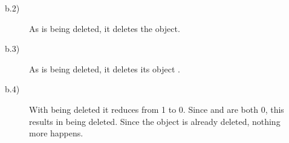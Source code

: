 \documentclass[pdf,ps2pdf,11pt]{SANDreport}
\begin{document}
\begin{description}
\begin{description}
  {}\item[b.2)] As {} is being deleted, it deletes the
  {} object.

  {}\item[b.3)] As {} is being deleted, it deletes its
  {} object {}.

  {}\item[b.4)] With {} being deleted it reduces
  {} from 1 to 0.  Since
  {} and {} are
  both 0, this results in {} being deleted.  Since the
  object {} is already deleted, nothing more happens.

  \end{description}

\end{description}
\end{document}
